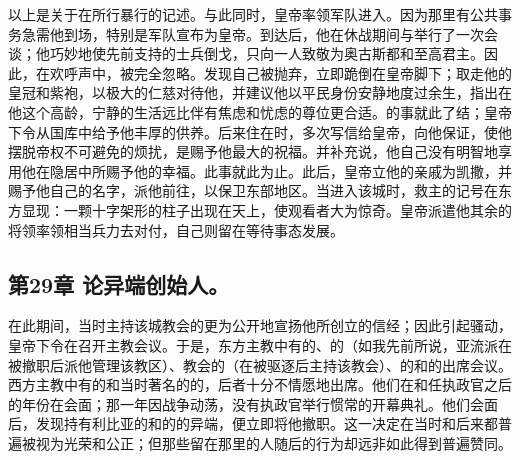 以上是关于在所行暴行的记述。与此同时，皇帝率领军队进入。因为那里有公共事务急需他到场，特别是军队宣布为皇帝。到达后，他在休战期间与举行了一次会谈；他巧妙地使先前支持的士兵倒戈，只向一人致敬为奥古斯都和至高君主。因此，在欢呼声中，被完全忽略。发现自己被抛弃，立即跪倒在皇帝脚下；取走他的皇冠和紫袍，以极大的仁慈对待他，并建议他以平民身份安静地度过余生，指出在他这个高龄，宁静的生活远比伴有焦虑和忧虑的尊位更合适。的事就此了结；皇帝下令从国库中给予他丰厚的供养。后来住在时，多次写信给皇帝，向他保证，使他摆脱帝权不可避免的烦扰，是赐予他最大的祝福。并补充说，他自己没有明智地享用他在隐居中所赐予他的幸福。此事就此为止。此后，皇帝立他的亲戚为凯撒，并赐予他自己的名字，派他前往，以保卫东部地区。当进入该城时，救主的记号在东方显现：一颗十字架形的柱子出现在天上，使观看者大为惊奇。皇帝派遣他其余的将领率领相当兵力去对付，自己则留在等待事态发展。\par


\subsection{第29章 论异端创始人。}

在此期间，当时主持该城教会的更为公开地宣扬他所创立的信经；因此引起骚动，皇帝下令在召开主教会议。于是，东方主教中有的、的（如我先前所说，亚流派在被撤职后派他管理该教区）、教会的（在被驱逐后主持该教会）、的和的出席会议。西方主教中有的和当时著名的的，后者十分不情愿地出席。他们在和任执政官之后的年份在会面；那一年因战争动荡，没有执政官举行惯常的开幕典礼。他们会面后，发现持有利比亚的和的的异端，便立即将他撤职。这一决定在当时和后来都普遍被视为光荣和公正；但那些留在那里的人随后的行为却远非如此得到普遍赞同。\par

